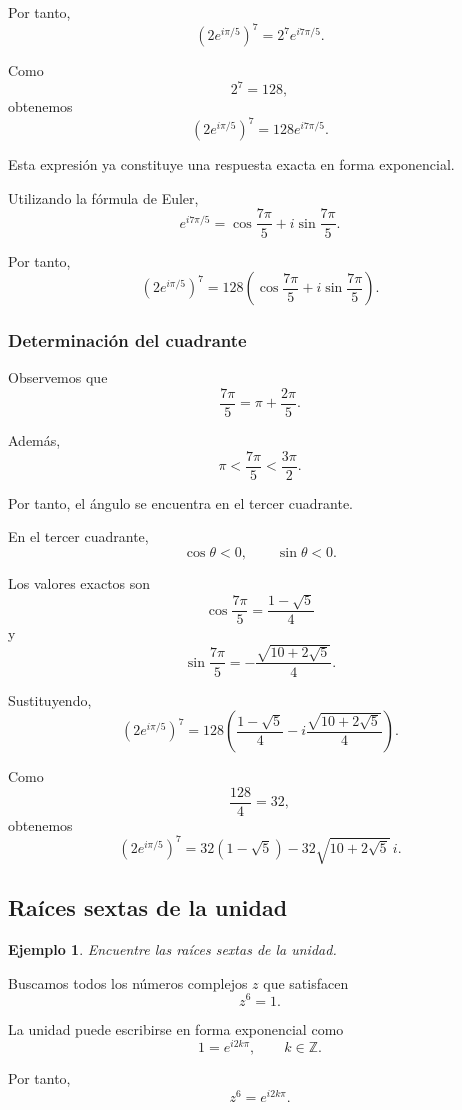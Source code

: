 \documentclass[12pt]{article}
\newtheorem{Ejem}{Ejemplo}
\begin{document}
Por tanto,
\[
\left(2e^{i\pi/5}\right)^7
=
2^7e^{i7\pi/5}.
\]

Como
\[
2^7=128,
\]
obtenemos
\[
\boxed{
\left(2e^{i\pi/5}\right)^7
=
128e^{i7\pi/5}
}.
\]

Esta expresión ya constituye una respuesta exacta en forma
exponencial.

Utilizando la fórmula de Euler,
\[
e^{i7\pi/5}
=
\cos\frac{7\pi}{5}
+
i\sin\frac{7\pi}{5}.
\]

Por tanto,
\[
\left(2e^{i\pi/5}\right)^7
=
128\left(
\cos\frac{7\pi}{5}
+
i\sin\frac{7\pi}{5}
\right).
\]

\subsubsection*{Determinación del cuadrante}

Observemos que
\[
\frac{7\pi}{5}
=
\pi+\frac{2\pi}{5}.
\]

Además,
\[
\pi
<
\frac{7\pi}{5}
<
\frac{3\pi}{2}.
\]

Por tanto, el ángulo se encuentra en el tercer cuadrante.

En el tercer cuadrante,
\[
\cos\theta<0,
\qquad
\sin\theta<0.
\]

Los valores exactos son
\[
\cos\frac{7\pi}{5}
=
\frac{1-\sqrt5}{4}
\]
y
\[
\sin\frac{7\pi}{5}
=
-\frac{\sqrt{10+2\sqrt5}}{4}.
\]

Sustituyendo,
\[
\left(2e^{i\pi/5}\right)^7
=
128
\left(
\frac{1-\sqrt5}{4}
-
i\frac{\sqrt{10+2\sqrt5}}{4}
\right).
\]

Como
\[
\frac{128}{4}=32,
\]
obtenemos
\[
\boxed{
\left(2e^{i\pi/5}\right)^7
=
32(1-\sqrt5)
-
32\sqrt{10+2\sqrt5}\,i
}.
\]

\subsection{Raíces sextas de la unidad}

\begin{Ejem}
Encuentre las raíces sextas de la unidad.
\end{Ejem}

Buscamos todos los números complejos $z$ que satisfacen
\[
z^6=1.
\]

La unidad puede escribirse en forma exponencial como
\[
1=e^{i2k\pi},
\qquad
k\in\mathbb Z.
\]

Por tanto,
\[
z^6=e^{i2k\pi}.
\]
\end{document}
